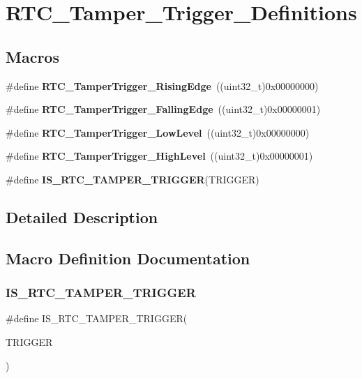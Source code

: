 \section{R\+T\+C\+\_\+\+Tamper\+\_\+\+Trigger\+\_\+\+Definitions}
\label{group__RTC__Tamper__Trigger__Definitions}
\subsection*{Macros}
\begin{DoxyCompactItemize}
\item 
\#define \textbf{ R\+T\+C\+\_\+\+Tamper\+Trigger\+\_\+\+Rising\+Edge}~((uint32\+\_\+t)0x00000000)
\item 
\#define \textbf{ R\+T\+C\+\_\+\+Tamper\+Trigger\+\_\+\+Falling\+Edge}~((uint32\+\_\+t)0x00000001)
\item 
\#define \textbf{ R\+T\+C\+\_\+\+Tamper\+Trigger\+\_\+\+Low\+Level}~((uint32\+\_\+t)0x00000000)
\item 
\#define \textbf{ R\+T\+C\+\_\+\+Tamper\+Trigger\+\_\+\+High\+Level}~((uint32\+\_\+t)0x00000001)
\item 
\#define \textbf{ I\+S\+\_\+\+R\+T\+C\+\_\+\+T\+A\+M\+P\+E\+R\+\_\+\+T\+R\+I\+G\+G\+ER}(T\+R\+I\+G\+G\+ER)
\end{DoxyCompactItemize}


\subsection{Detailed Description}


\subsection{Macro Definition Documentation}
\mbox{\label{group__RTC__Tamper__Trigger__Definitions_ga4b0308730f7fa04b8db39270d0b90ca5}} 
\subsubsection{I\+S\+\_\+\+R\+T\+C\+\_\+\+T\+A\+M\+P\+E\+R\+\_\+\+T\+R\+I\+G\+G\+ER}
{\footnotesize\ttfamily \#define I\+S\+\_\+\+R\+T\+C\+\_\+\+T\+A\+M\+P\+E\+R\+\_\+\+T\+R\+I\+G\+G\+ER(\begin{DoxyParamCaption}\item[{}]{T\+R\+I\+G\+G\+ER }\end{DoxyParamCaption})}

